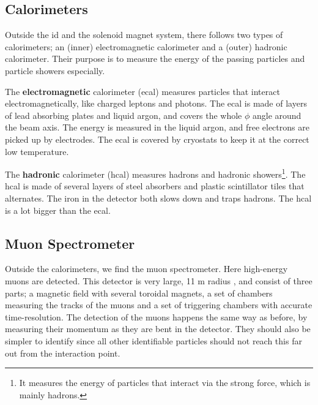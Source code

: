 \documentclass[a4paper, american, 12pt]{report}
\begin{document}
	
	
	\subsection{Calorimeters}
	\label{subsect:Theory-Calorimeters}
	Outside the \acrshort{id} and the solenoid magnet system, there follows two types of calorimeters; an (inner) electromagnetic calorimeter and a (outer) hadronic calorimeter. Their purpose is to measure the energy of the passing particles and particle showers especially. %
	
	The \textbf{electromagnetic} calorimeter (\acrshort{ecal}) measures particles that interact electromagnetically, like charged leptons and photons. The \acrshort{ecal} is made of layers of lead absorbing plates and liquid argon, and covers the whole $\phi$ angle around the beam axis. The energy is measured in the liquid argon, and free electrons are picked up by electrodes. The \acrshort{ecal} is covered by cryostats to keep it at the correct low temperature. %
	
	The \textbf{hadronic} calorimeter (\acrshort{hcal}) measures hadrons and hadronic showers\footnote[14]{It measures the energy of particles that interact via the strong force, which is mainly hadrons.}. The \acrshort{hcal} is made of several layers of steel absorbers and plastic scintillator tiles that alternates. The iron in the detector both slows down and traps hadrons. The \acrshort{hcal} is a lot bigger than the \acrshort{ecal}. 
	
	
	\subsection{Muon Spectrometer}
	\label{subsect:Theory-MuonSpectrometer}
	Outside the calorimeters, we find the muon spectrometer. Here high-energy muons are detected. This detector is very large, 11 m radius \cite{ATLAS_Muon_spec}, and consist of three parts; a magnetic field with several toroidal magnets, a set of chambers measuring the tracks of the muons and a set of triggering chambers with accurate time-resolution. The detection of the muons happens the same way as before, by measuring their momentum as they are bent in the detector. They should also be simpler to identify since all other identifiable particles should not reach this far out from the interaction point.
	
\end{document}
